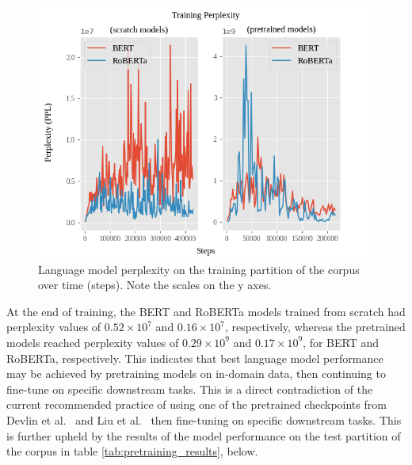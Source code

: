 \documentclass[12pt]{article}
\begin{document}
\begin{figure}[h!]
    \includegraphics[width=\linewidth]{figures/training_ppl.png}
    \caption{Language model perplexity on the training partition of the corpus over time (steps). Note the scales on the y axes.}
    \label{fig:training_ppl}
\end{figure}

\noindent
At the end of training, the BERT and RoBERTa models trained from scratch had perplexity values of $0.52\times 10^7$ and $0.16\times 10^7$,
respectively, whereas the pretrained models reached perplexity values of $0.29\times 10^9$ and $0.17\times 10^9$, for BERT and RoBERTa, respectively.
This indicates that best language model performance may be achieved by pretraining models on in-domain data, then continuing to fine-tune on specific
downstream tasks. This is a direct contradiction of the current recommended practice of using one of the pretrained checkpoints from Devlin et
al.~\cite{devlin_bert_2019} and Liu et al.~\cite{liu_roberta_2019} then fine-tuning on specific downstream tasks. This is further upheld by the
results of the model performance on the test partition of the corpus in table \ref{tab:pretraining_results}, below.
\end{document}
